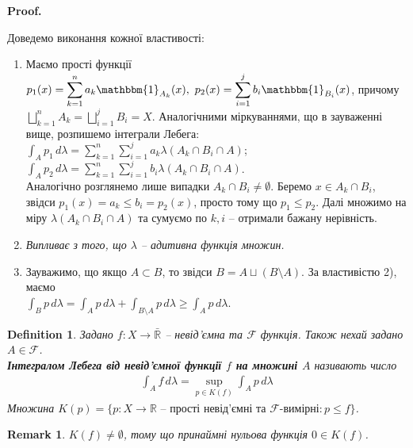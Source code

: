 \documentclass[a4paper, 10pt]{article}
\makeatletter
\theoremstyle{theoremdd}
\newtheorem{definition}[theorem]{Definition}
\newtheorem{remark}[theorem]{Remark}
\renewenvironment{proof}[1][Proof.\\]{\par
\pushQED{\hfill \qed}%
\normalfont \topsep6\p@\@plus6\p@\relax
\trivlist
\item\relax
{\bfseries
#1\@addpunct{.}}\hspace\labelsep\ignorespaces
}{%
\popQED\endtrivlist\@endpefalse
}
\makeatother
\begin{document}
\begin{proof}
Доведемо виконання кожної властивості:
\begin{enumerate}[wide=0pt,label={\arabic*)}]
\item Маємо прості функції $p_1(x) = \displaystyle\sum_{k=1}^n a_k \mathbbm{1}_{A_k}(x),\ p_2(x) = \displaystyle\sum_{i=1}^j b_i \mathbbm{1}_{B_i}(x)$, причому $\displaystyle\bigsqcup_{k=1}^n A_k = \bigsqcup_{i=1}^j B_i = X$. Аналогічними міркуваннями, що в зауваженні вище, розпишемо інтеграли Лебега:\\
$\displaystyle\int_A p_1\,d\lambda = \displaystyle\sum_{k=1}^n \sum_{i=1}^j a_k \lambda(A_k \cap B_i \cap A)$;\\
$\displaystyle\int_A p_2\,d\lambda = \displaystyle\sum_{k=1}^n \sum_{i=1}^j b_i \lambda(A_k \cap B_i \cap A)$.\\
Аналогічно розглянемо лише випадки $A_k \cap B_i \neq \emptyset$. Беремо $x \in A_k \cap B_i$, звідси $p_1(x) = a_k \leq b_i = p_2(x)$, просто тому що $p_1 \leq p_2$. Далі множимо на міру $\lambda(A_k \cap B_i \cap A)$ та сумуємо по $k,i$ -- отримали бажану нерівність.

\item \textit{Випливає з того, що $\lambda$ -- адитивна функція множин.}

\item Зауважимо, що якщо $A \subset B$, то звідси $B = A \sqcup (B \setminus A)$. За властивістю 2), маємо\\
$\displaystyle\int_B p\,d\lambda = \int_A p\,d\lambda + \int_{B \setminus A}p\,d\lambda \geq \int_A p\,d\lambda$.
\end{enumerate}
\end{proof}

\begin{definition}
Задано $f \colon X \to \bar{\mathbb{R}}$ -- невід'ємна та $\mathcal{F}$ функція. Також нехай задано $A \in \mathcal{F}$.\\
\textbf{Інтегралом Лебега від невід'ємної функції $f$ на множині $A$} називають число
\begin{align*}
\int_A f\,d\lambda = \sup_{p \in K(f)} \int_A p\,d\lambda
\end{align*}
Множина $K(p) = \{ p \colon X \to \mathbb{R} \text{ -- прості невід'ємні та } \mathcal{F}\text{-вимірні}: p \leq f\}$.
\end{definition}

\begin{remark}
$K(f) \neq \emptyset$, тому що принаймні нульова функція $0 \in K(f)$.
\end{remark}
\end{document}
